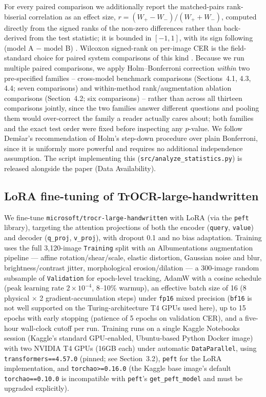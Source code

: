 \documentclass[12pt]{article}
\begin{document}
For every paired comparison we additionally report the matched-pairs rank-biserial correlation as an effect
size, $r = (W_{+} - W_{-}) / (W_{+} + W_{-})$, computed directly from the signed ranks of the non-zero
differences rather than back-derived from the test statistic; it is bounded in $[-1, 1]$, with its sign
following (model A $-$ model B) \citep{Cureton1956RankBiserial}. Wilcoxon signed-rank on per-image CER is the
field-standard choice for paired system comparisons of this kind \citep{Dror2018Wilcoxon}. Because we run
multiple paired comparisons, we apply Holm--Bonferroni correction \citep{Holm1979} \textit{within} two
pre-specified families -- cross-model benchmark comparisons (Sections~4.1, 4.3, 4.4; seven comparisons) and
within-method rank/augmentation ablation comparisons (Section~4.2; six comparisons) -- rather than across
all thirteen comparisons jointly, since the two families answer different questions and pooling them would
over-correct the family a reader actually cares about; both families and the exact test order were fixed
before inspecting any $p$-value. We follow Dem\v{s}ar's \citep{Demsar2006} recommendation of Holm's
step-down procedure over plain Bonferroni, since it is uniformly more powerful and requires no additional
independence assumption. The script implementing this (\texttt{src/analyze\_statistics.py}) is released
alongside the paper (Data Availability).

\subsection{LoRA fine-tuning of TrOCR-large-handwritten}

We fine-tune \texttt{microsoft/trocr-large-handwritten} with LoRA (via the \texttt{peft} library), targeting
the attention projections of both the encoder (\texttt{query}, \texttt{value}) and decoder
(\texttt{q\_proj}, \texttt{v\_proj}), with dropout 0.1 and no bias adaptation. Training uses the full
3{,}120-image \texttt{Training} split with an Albumentations augmentation pipeline --- affine
rotation/shear/scale, elastic distortion, Gaussian noise and blur, brightness/contrast jitter, morphological
erosion/dilation --- a 300-image random subsample of \texttt{Validation} for epoch-level tracking, AdamW
with a cosine schedule (peak learning rate $2\times10^{-4}$, 8--10\% warmup), an effective batch size of 16
(8 physical $\times$ 2 gradient-accumulation steps) under \texttt{fp16} mixed precision (\texttt{bf16} is
not well supported on the Turing-architecture T4 GPUs used here), up to 15 epochs with early stopping
(patience of 5 epochs on validation CER), and a five-hour wall-clock cutoff per run. Training runs on a
single Kaggle Notebooks session (Kaggle's standard GPU-enabled, Ubuntu-based Python Docker image) with two
NVIDIA T4 GPUs (16GB each) under automatic \texttt{DataParallel}, using \texttt{transformers==4.57.0}
(pinned; see Section~3.2), \texttt{peft} for the LoRA implementation, and \texttt{torchao>=0.16.0} (the
Kaggle base image's default \texttt{torchao==0.10.0} is incompatible with \texttt{peft}'s
\texttt{get\_peft\_model} and must be upgraded explicitly).
\end{document}
